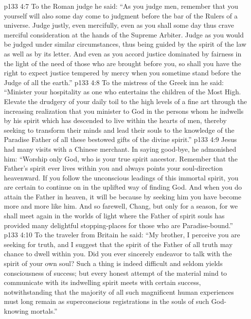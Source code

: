 \pc \vs p133 4:7 To the Roman judge he said: \textcolor{ubdarkred}{“As you judge men, remember that you yourself will also some day come to judgment before the bar of the Rulers of a universe. Judge justly, even mercifully, even as you shall some day thus crave merciful consideration at the hands of the Supreme Arbiter. Judge as you would be judged under similar circumstances, thus being guided by the spirit of the law as well as by its letter. And even as you accord justice dominated by fairness in the light of the need of those who are brought before you, so shall you have the right to expect justice tempered by mercy when you sometime stand before the Judge of all the earth.”}
\pc \vs p133 4:8 To the mistress of the Greek inn he said: \textcolor{ubdarkred}{“Minister your hospitality as one who entertains the children of the Most High. Elevate the drudgery of your daily toil to the high levels of a fine art through the increasing realization that you minister to God in the persons whom he indwells by his spirit which has descended to live within the hearts of men, thereby seeking to transform their minds and lead their souls to the knowledge of the Paradise Father of all these bestowed gifts of the divine spirit.”}
\pc \vs p133 4:9 Jesus had many visits with a Chinese merchant. In saying good\hyp{}bye, he admonished him: \textcolor{ubdarkred}{“Worship only God, who is your true spirit ancestor. Remember that the Father’s spirit ever lives within you and always points your soul\hyp{}direction heavenward. If you follow the unconscious leadings of this immortal spirit, you are certain to continue on in the uplifted way of finding God. And when you do attain the Father in heaven, it will be because by seeking him you have become more and more like him. And so farewell, Chang, but only for a season, for we shall meet again in the worlds of light where the Father of spirit souls has provided many delightful stopping\hyp{}places for those who are Paradise\hyp{}bound.”}
\pc \vs p133 4:10 To the traveler from Britain he said: \textcolor{ubdarkred}{“My brother, I perceive you are seeking for truth, and I suggest that the spirit of the Father of all truth may chance to dwell within you. Did you ever sincerely endeavor to talk with the spirit of your own soul? Such a thing is indeed difficult and seldom yields consciousness of success; but every honest attempt of the material mind to communicate with its indwelling spirit meets with certain success, notwithstanding that the majority of all such magnificent human experiences must long remain as superconscious registrations in the souls of such God\hyp{}knowing mortals.”}
